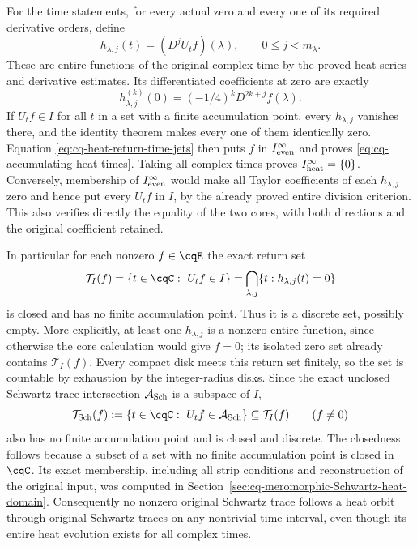 For the time statements, for every actual zero and every one
of its required derivative orders, define
\[
 h_{\lambda,j}(t)=(D^jU_tf)(\lambda),
 \qquad 0\leq j<m_\lambda.
\]
These are entire functions of the original complex time by the
proved heat series and derivative estimates. Its differentiated
coefficients at zero are exactly
\begin{equation}\label{eq:cq-heat-return-time-jets}
 h_{\lambda,j}^{(k)}(0)=(-1/4)^kD^{2k+j}f(\lambda).
\end{equation}
If $U_tf\in I$ for all $t$ in a set with a finite accumulation
point, every $h_{\lambda,j}$ vanishes there, and the identity
theorem makes every one of them identically zero.
Equation \eqref{eq:cq-heat-return-time-jets} then puts $f$
in $I_{\rm even}^{\infty}$ and proves
\eqref{eq:cq-accumulating-heat-times}.
Taking all complex times proves
$I_{\rm heat}^{\infty}=\{0\}$.
Conversely, membership of $I_{\rm even}^{\infty}$ would make
all Taylor coefficients of each $h_{\lambda,j}$ zero and hence
put every $U_tf$ in $I$, by the already proved entire division
criterion. This also verifies directly the equality of the two
cores, with both directions and the original coefficient retained.

In particular for each nonzero $f\in\cqE$ the exact return set
\begin{equation}\label{eq:cq-heat-return-set}
 \mathcal T_I(f)=\{t\in\cqC:\ U_tf\in I\}
   =\bigcap_{\lambda,j}\{t:h_{\lambda,j}(t)=0\}
\end{equation}
is closed and has no finite accumulation point. Thus it is a
discrete set, possibly empty. More explicitly, at least one
$h_{\lambda,j}$ is a nonzero entire function, since otherwise
the core calculation would give $f=0$; its isolated zero set
already contains $\mathcal T_I(f)$. Every compact disk meets
this return set finitely, so the set is countable by exhaustion
by the integer-radius disks.
Since the exact unclosed Schwartz trace intersection
$\mathcal A_{\rm Sch}$ is a subspace of $I$,
\begin{equation}\label{eq:cq-Schwartz-discrete-returns}
 \mathcal T_{\rm Sch}(f)
   :=\{t\in\cqC:\ U_tf\in\mathcal A_{\rm Sch}\}
   \subseteq\mathcal T_I(f)
 \qquad(f\ne0)
\end{equation}
also has no finite accumulation point and is closed and
discrete. The closedness follows because a subset of a set
with no finite accumulation point is closed in $\cqC$.
Its exact membership, including all strip conditions and
reconstruction of the original input, was computed in
Section~\ref{sec:cq-meromorphic-Schwartz-heat-domain}.
Consequently no nonzero original Schwartz trace follows a heat
orbit through original Schwartz traces on any nontrivial time
interval, even though its entire heat evolution exists for all
complex times.

